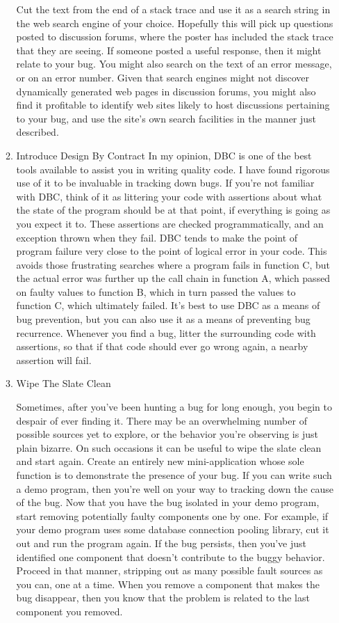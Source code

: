 \documentclass{article}
\begin{document}
\begin{enumerate}
\begin{enumerate}
Cut the text from the end of a stack trace and use it as a search string
in the web search engine of your choice. Hopefully this will pick up
questions posted to discussion forums, where the poster has included the
stack trace that they are seeing. If someone posted a useful response,
then it might relate to your bug. You might also search on the text of
an error message, or on an error number. Given that search engines might
not discover dynamically generated web pages in discussion forums, you
might also find it profitable to identify web sites likely to host
discussions pertaining to your bug, and use the site's own search
facilities in the manner just described.

\item Introduce Design By Contract
\label{sec:orgheadline307}
In my opinion, DBC is one of the best tools available to assist you in
writing quality code. I have found rigorous use of it to be invaluable
in tracking down bugs. If you're not familiar with DBC, think of it as
littering your code with assertions about what the state of the program
should be at that point, if everything is going as you expect it to.
These assertions are checked programmatically, and an exception thrown
when they fail. DBC tends to make the point of program failure very
close to the point of logical error in your code. This avoids those
frustrating searches where a program fails in function C, but the actual
error was further up the call chain in function A, which passed on
faulty values to function B, which in turn passed the values to function
C, which ultimately failed. It's best to use DBC as a means of bug
prevention, but you can also use it as a means of preventing bug
recurrence. Whenever you find a bug, litter the surrounding code with
assertions, so that if that code should ever go wrong again, a nearby
assertion will fail.

\item Wipe The Slate Clean
\label{sec:orgheadline311}

Sometimes, after you've been hunting a bug for long enough, you begin to
despair of ever finding it. There may be an overwhelming number of
possible sources yet to explore, or the behavior you're observing is
just plain bizarre. On such occasions it can be useful to wipe the slate
clean and start again. Create an entirely new mini-application whose
sole function is to demonstrate the presence of your bug. If you can
write such a demo program, then you're well on your way to tracking down
the cause of the bug. Now that you have the bug isolated in your demo
program, start removing potentially faulty components one by one. For
example, if your demo program uses some database connection pooling
library, cut it out and run the program again. If the bug persists, then
you've just identified one component that doesn't contribute to the
buggy behavior. Proceed in that manner, stripping out as many possible
fault sources as you can, one at a time. When you remove a component
that makes the bug disappear, then you know that the problem is related
to the last component you removed.


\end{enumerate}
\end{enumerate}
\end{document}
